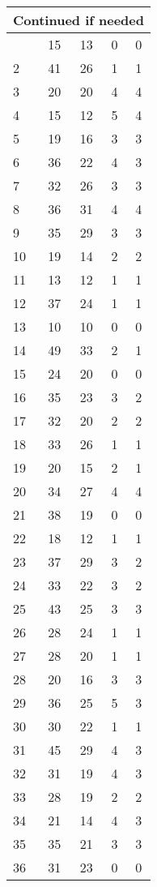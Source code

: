 \begin{center}
\begin{longtable}{l|c|c|c|c}
\hline \multicolumn{5}{|r|}{{Continued if needed}} \\ \hline
\endfoot 
1 & 15 & 13 & 0 & 0\\ \hline
2 & 41 & 26 & 1 & 1\\ \hline
3 & 20 & 20 & 4 & 4\\ \hline
4 & 15 & 12 & 5 & 4\\ \hline
5 & 19 & 16 & 3 & 3\\ \hline
6 & 36 & 22 & 4 & 3\\ \hline
7 & 32 & 26 & 3 & 3\\ \hline
8 & 36 & 31 & 4 & 4\\ \hline
9 & 35 & 29 & 3 & 3\\ \hline
10 & 19 & 14 & 2 & 2\\ \hline
11 & 13 & 12 & 1 & 1\\ \hline
12 & 37 & 24 & 1 & 1\\ \hline
13 & 10 & 10 & 0 & 0\\ \hline
14 & 49 & 33 & 2 & 1\\ \hline
15 & 24 & 20 & 0 & 0\\ \hline
16 & 35 & 23 & 3 & 2\\ \hline
17 & 32 & 20 & 2 & 2\\ \hline
18 & 33 & 26 & 1 & 1\\ \hline
19 & 20 & 15 & 2 & 1\\ \hline
20 & 34 & 27 & 4 & 4\\ \hline
21 & 38 & 19 & 0 & 0\\ \hline
22 & 18 & 12 & 1 & 1\\ \hline
23 & 37 & 29 & 3 & 2\\ \hline
24 & 33 & 22 & 3 & 2\\ \hline
25 & 43 & 25 & 3 & 3\\ \hline
26 & 28 & 24 & 1 & 1\\ \hline
27 & 28 & 20 & 1 & 1\\ \hline
28 & 20 & 16 & 3 & 3\\ \hline
29 & 36 & 25 & 5 & 3\\ \hline
30 & 30 & 22 & 1 & 1\\ \hline
31 & 45 & 29 & 4 & 3\\ \hline
32 & 31 & 19 & 4 & 3\\ \hline
33 & 28 & 19 & 2 & 2\\ \hline
34 & 21 & 14 & 4 & 3\\ \hline
35 & 35 & 21 & 3 & 3\\ \hline
36 & 31 & 23 & 0 & 0\\ \hline

\end{longtable}
\end{center}
